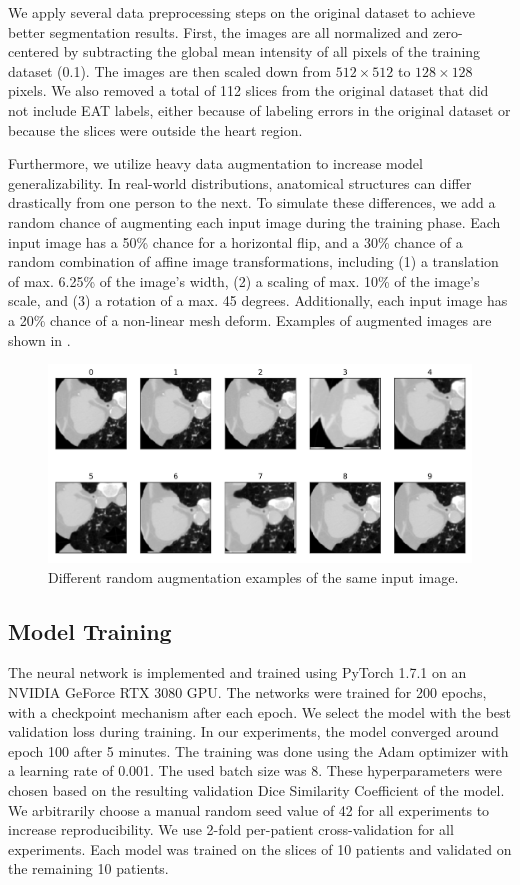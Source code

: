 We apply several data preprocessing steps on the original dataset to achieve better segmentation results. First, the images are all normalized and zero-centered by subtracting the global mean intensity of all pixels of the training dataset (0.1). The images are then scaled down from $512 \times 512$ to $128 \times 128$ pixels. We also removed a total of 112 slices from the original dataset that did not include EAT labels, either because of labeling errors in the original dataset or because the slices were outside the heart region.

Furthermore, we utilize heavy data augmentation to increase model generalizability. In real-world distributions, anatomical structures can differ drastically from one person to the next. To simulate these differences, we add a random chance of augmenting each input image during the training phase. Each input image has a 50\% chance for a horizontal flip, and a 30\% chance of a random combination of affine image transformations, including (1) a translation of max. 6.25\% of the image's width, (2) a scaling of max. 10\% of the image's scale, and (3) a rotation of a max. 45 degrees. Additionally, each input image has a 20\% chance of a non-linear mesh deform. Examples of augmented images are shown in .

\begin{figure}[t!]
\center
\includegraphics[width=\textwidth]{images/6/augmentation.png}
\caption{Different random augmentation examples of the same input image. \cite{bencevicEpicardialAdiposeTissue2021}}
\label{fig:augment}
\end{figure}

\subsection{Model Training}

The neural network is implemented and trained using PyTorch 1.7.1 on an NVIDIA GeForce RTX 3080 GPU. The networks were trained for 200 epochs, with a checkpoint mechanism after each epoch. We select the model with the best validation loss during training. In our experiments, the model converged around epoch 100 after 5 minutes. The training was done using the Adam optimizer with a learning rate of 0.001. The used batch size was 8. These hyperparameters were chosen based on the resulting validation Dice Similarity Coefficient of the model. We arbitrarily choose a manual random seed value of 42 for all experiments to increase reproducibility. We use 2-fold per-patient cross-validation for all experiments. Each model was trained on the slices of 10 patients and validated on the remaining 10 patients.

